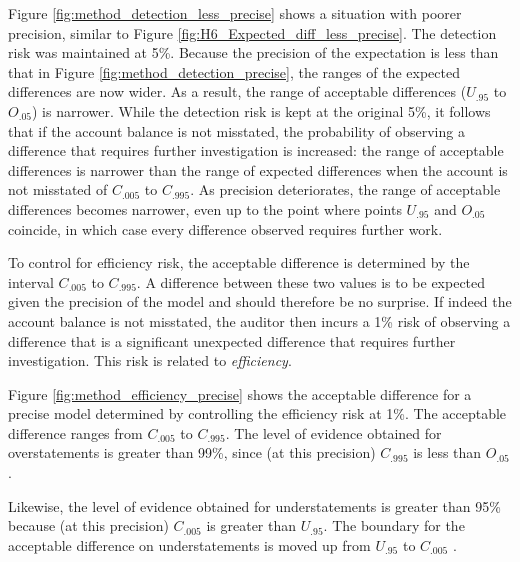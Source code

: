 \bigskip
Figure \ref{fig:method_detection_less_precise} shows a situation with poorer precision, similar to Figure \ref{fig:H6_Expected_diff_less_precise}. The detection risk was maintained at 5\%.
Because the precision of the expectation is less than that in Figure \ref{fig:method_detection_precise}, the ranges of the expected differences are now wider. As a result, the range of acceptable differences ($U_{.95}$ to $O_{.05}$) is narrower. While the detection risk is kept at the original 5\%, it follows that if the account balance is not misstated, the probability of observing a difference that requires further investigation is increased: the range of acceptable differences is narrower than the range of expected differences when the account is not misstated of $C_{.005}$ to $C_{.995}$. As precision deteriorates, the range of acceptable differences becomes narrower, even up to the point where points $U_{.95}$ and $O_{.05}$ coincide, in which case every difference observed requires further work.

To control\label{mar:controlling_efficiency_risk} for efficiency risk, the acceptable difference is determined by the interval $C_{.005}$ to $C_{.995}$. A difference between these two values is to be expected given the precision of the model and should therefore be no surprise. If indeed the account balance is not misstated, the auditor then incurs a 1\% risk of observing a difference that is a significant unexpected difference that requires further investigation. This risk is related to \emph{efficiency}. 

Figure \ref{fig:method_efficiency_precise} shows the acceptable difference for a precise model determined by controlling the efficiency risk at 1\%. The acceptable difference ranges from $C_{.005}$ to $C_{.995}$. The level of evidence obtained for overstatements is greater than 99\%, since (at this precision) $C_{.995}$ is less than $O_{.05}$. 

Likewise, the level of evidence obtained for understatements is greater than 95\% because (at this precision) $C_{.005}$ is greater than $U_{.95}$. The boundary for the acceptable difference on understatements is moved up from $U_{.95}$ to $C_{.005}$
.

